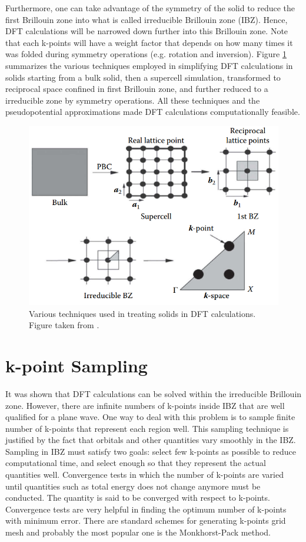 Furthermore, one can take advantage of the symmetry of the solid to reduce the first Brillouin zone into what is called irreducible Brillouin zone (IBZ). Hence, DFT calculations will be narrowed down further into this Brillouin zone. Note that each k-points will have a weight factor that depends on how many times it was folded during symmetry operations (e.g. rotation and inversion). Figure \ref{fig:dft_solid} summarizes the various techniques employed in simplifying DFT calculations in solids starting from a bulk solid, then a supercell simulation, transformed to reciprocal space confined in first Brillouin zone, and further reduced to a irreducible zone by symmetry operations. All these techniques and the pseudopotential approximations made DFT calculations computationally feasible.
\begin{figure}[tbh!]
    \centering
    \includegraphics[width=0.6\linewidth]{"images/computational/dft_solid"}
    \caption[Various techniques used in treating solids in DFT calculations.]{Various techniques used in treating solids in DFT calculations. Figure taken from \citep{Lee2016}.}
    \label{fig:dft_solid}
\end{figure}

\section{k-point Sampling}
It was shown that DFT calculations can be solved within the irreducible Brillouin zone. However, there are infinite numbers of k-points inside IBZ that are well qualified for a plane wave. One way to deal with this problem is to sample finite number of k-points that represent each region well. This sampling technique is justified by the fact that orbitals and other quantities vary smoothly in the IBZ. Sampling in IBZ must satisfy two goals: select few k-points as possible to reduce computational time, and select enough so that they represent the actual quantities well. Convergence tests  in which the  number of k-points are varied until quantities such as total energy does not change anymore must be conducted. The quantity is said to be converged with respect to k-points.  Convergence tests are very helpful in finding the optimum number of k-points with minimum error. There are standard schemes for generating k-points grid mesh and probably the most popular one is the Monkhorst-Pack method.  

